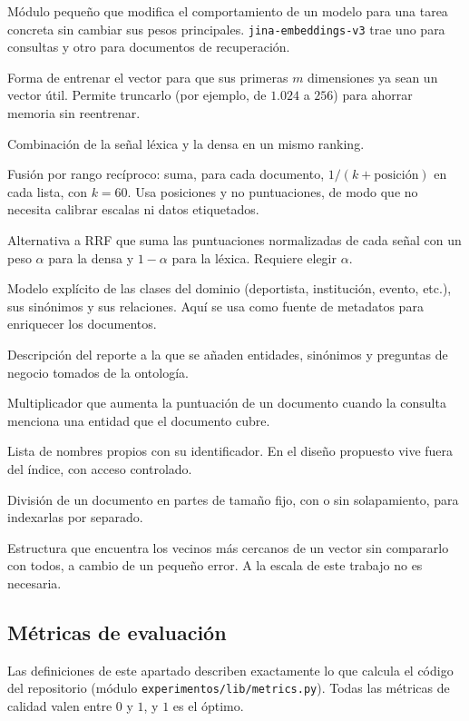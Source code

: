 \documentclass[11pt,letterpaper]{article}
\numberwithin{equation}{section}
\begin{document}
\begin{description}[leftmargin=0pt,itemsep=2pt,font=\normalfont\bfseries]
  \item[Adaptador LoRA.] Módulo pequeño que modifica el comportamiento de un modelo para una tarea concreta sin cambiar sus pesos principales. \texttt{jina-embeddings-v3} trae uno para consultas y otro para documentos de recuperación.
  \item[Representación Matryoshka.] Forma de entrenar el vector para que sus primeras $m$ dimensiones ya sean un vector útil. Permite truncarlo (por ejemplo, de $1.024$ a $256$) para ahorrar memoria sin reentrenar.
  \item[Recuperación híbrida.] Combinación de la señal léxica y la densa en un mismo ranking.
  \item[RRF (\textit{Reciprocal Rank Fusion}).] Fusión por rango recíproco: suma, para cada documento, $1/(k + \text{posición})$ en cada lista, con $k=60$. Usa posiciones y no puntuaciones, de modo que no necesita calibrar escalas ni datos etiquetados.
  \item[Combinación convexa.] Alternativa a RRF que suma las puntuaciones normalizadas de cada señal con un peso $\alpha$ para la densa y $1-\alpha$ para la léxica. Requiere elegir $\alpha$.
  \item[Ontología.] Modelo explícito de las clases del dominio (deportista, institución, evento, etc.), sus sinónimos y sus relaciones. Aquí se usa como fuente de metadatos para enriquecer los documentos.
  \item[Documento enriquecido.] Descripción del reporte a la que se añaden entidades, sinónimos y preguntas de negocio tomados de la ontología.
  \item[Realce por entidad.] Multiplicador que aumenta la puntuación de un documento cuando la consulta menciona una entidad que el documento cubre.
  \item[Diccionario de entidades (\textit{gazetteer}).] Lista de nombres propios con su identificador. En el diseño propuesto vive fuera del índice, con acceso controlado.
  \item[Fragmentación (\textit{chunking}).] División de un documento en partes de tamaño fijo, con o sin solapamiento, para indexarlas por separado.
  \item[Índice aproximado (ANN, HNSW).] Estructura que encuentra los vecinos más cercanos de un vector sin compararlo con todos, a cambio de un pequeño error. A la escala de este trabajo no es necesaria.
\end{description}

\subsection*{Métricas de evaluación}
\label{sec:glosario-metricas}
Las definiciones de este apartado describen exactamente lo que calcula el código del repositorio (módulo \texttt{experimentos/lib/metrics.py}). Todas las métricas de calidad valen entre $0$ y $1$, y $1$ es el óptimo.
\end{document}
